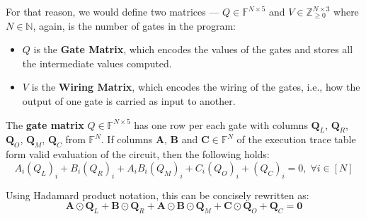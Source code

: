 \documentclass[../../book.tex]{subfiles}
\begin{document}
For that reason, we would define two matrices --- $Q \in \mathbb{F}^{N \times
5}$ and $V \in \mathbb{Z}_{\geq 0}^{N \times 3}$ where $N \in \mathbb{N}$, again, is the number of gates in the
program:
\begin{itemize}
    \item $Q$ is the \textbf{Gate Matrix}, which encodes the values of the gates and stores all the intermediate values computed.
    \item $V$ is the \textbf{Wiring Matrix}, which encodes the wiring of the gates, i.e., how the output of one gate is carried as input to another.
\end{itemize}

\begin{definition}
The \textbf{gate matrix} $Q \in \mathbb{F}^{N \times 5}$ has one row per each gate with columns $\mathbf{Q}_L$,
$\mathbf{Q}_R$, $\mathbf{Q}_O$, $\mathbf{Q}_M$, $\mathbf{Q}_C$ from
$\mathbb{F}^N$. If columns $\mathbf{A}$, $\mathbf{B}$ and $\mathbf{C} \in
\mathbb{F}^N$ of the execution trace table form valid evaluation of the circuit, 
then the following holds:
\begin{equation*}
    A_i (Q_{L})_i + B_i (Q_{R})_i + A_i B_i (Q_{M})_i + C_i (Q_{O})_i + (Q_{C})_i = 0, \; \forall i \in [N]    
\end{equation*}

Using Hadamard product notation, this can be concisely rewritten as:
\begin{equation*}
    \mathbf{A} \odot \mathbf{Q}_L + \mathbf{B} \odot \mathbf{Q}_R + \mathbf{A} \odot \mathbf{B} \odot \mathbf{Q}_M + \mathbf{C} \odot \mathbf{Q}_O + \mathbf{Q}_C = \mathbf{0}
\end{equation*}

\end{definition}
\end{document}
